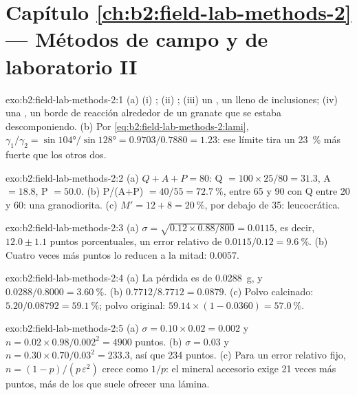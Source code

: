 \section*{Capítulo \ref{ch:b2:field-lab-methods-2} --- Métodos de campo y de laboratorio II}

\begin{solution}{exo:b2:field-lab-methods-2:1}
(a) (i) ; (ii) ; (iii) un , un  lleno de
inclusiones; (iv) una , un borde de reacción alrededor de un granate que se estaba descomponiendo. (b) Por
\eqref{eq:b2:field-lab-methods-2:lami}, $\gamma_1/\gamma_2 = \sin\ang{104}/\sin\ang{128} =
0.9703/0.7880 = 1.23$: ese límite tira un \qty{23}{\percent} más fuerte que los otros dos.
\end{solution}

\begin{solution}{exo:b2:field-lab-methods-2:2}
(a) $Q + A + P = 80$: Q $= 100 \times 25/80 = 31.3$, A $= 18.8$, P $= 50.0$. (b) P/(A+P) $=
40/55 = \qty{72.7}{\percent}$, entre 65 y 90 con Q entre 20 y 60: una granodiorita.
(c) $M' = 12 + 8 = \qty{20}{\percent}$, por debajo de 35: leucocrática.
\end{solution}

\begin{solution}{exo:b2:field-lab-methods-2:3}
(a) $\sigma = \sqrt{0.12 \times 0.88/800} = 0.0115$, es decir, $12.0 \pm 1.1$ puntos porcentuales, un
error relativo de $0.0115/0.12 = \qty{9.6}{\percent}$. (b) Cuatro veces más puntos lo reducen a la mitad: $0.0057$.
\end{solution}

\begin{solution}{exo:b2:field-lab-methods-2:4}
(a) La pérdida es de \qty{0.0288}{g}, y $0.0288/0.8000 = \qty{3.60}{\percent}$.
(b) $0.7712/8.7712 = 0.0879$.
(c) Polvo calcinado: $5.20/0.08792 = \qty{59.1}{\percent}$; polvo original:
$59.14 \times (1 - 0.0360) = \qty{57.0}{\percent}$.
\end{solution}

\begin{solution}{exo:b2:field-lab-methods-2:5}
(a) $\sigma = 0.10 \times 0.02 = 0.002$ y $n = 0.02 \times 0.98/0.002^2 = 4900$ puntos.
(b) $\sigma = 0.03$ y $n = 0.30 \times 0.70/0.03^2 = 233.3$, así que 234 puntos. (c) Para un error relativo
fijo, $n = (1-p)/(p\,\varepsilon^2)$ crece como $1/p$: el mineral accesorio exige 21 veces más
puntos, más de los que suele ofrecer una lámina.
\end{solution}


